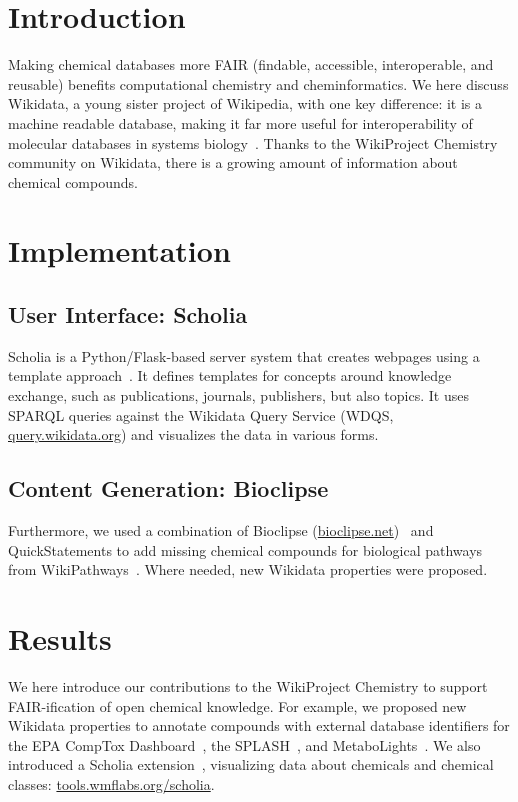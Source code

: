 \documentclass{bmcart}
\begin{document}
\section*{Introduction}

Making chemical databases more FAIR (findable, accessible, interoperable, and reusable) benefits
computational chemistry and cheminformatics. We here discuss Wikidata, a young sister project of
Wikipedia, with one key difference: it is a machine readable database, making it far more useful for
interoperability of molecular databases in systems biology~\cite{Mietchen2015,Putman2017}. Thanks to
the WikiProject Chemistry community on Wikidata, there is a growing amount of information about
chemical compounds.

\section*{Implementation}

\subsection*{User Interface: Scholia}

Scholia is a Python/Flask-based server system that creates webpages using a template
approach~\cite{Nielsen2017}.
It defines templates for concepts around knowledge exchange, such as publications, journals,
publishers, but also topics. It uses SPARQL queries against the Wikidata Query Service (WDQS,
\href{http://query.wikidata.org/}{query.wikidata.org}) and visualizes the data in various forms.

\subsection*{Content Generation: Bioclipse}

Furthermore, we used a combination of Bioclipse (\href{http://bioclipse.net/}{bioclipse.net})~\cite{Spjuth2007,Spjuth2009}
and QuickStatements to add missing chemical compounds for biological
pathways from WikiPathways~\cite{Pico2008,Slenter2018}. Where needed, new Wikidata properties were proposed.

\section*{Results}

We here introduce our contributions to the WikiProject Chemistry to support FAIR-ification of open chemical knowledge. For example, we proposed new Wikidata properties to annotate compounds with external database identifiers for the EPA CompTox Dashboard~\cite{Williams2017},
the SPLASH~\cite{Wohlgemuth2016}, and MetaboLights~\cite{Haug2013}. We also introduced a
Scholia extension~\cite{Nielsen2017}, visualizing data about chemicals and chemical classes: \href{https://tools.wmflabs.org/scholia}{tools.wmflabs.org/scholia}.
\end{document}

